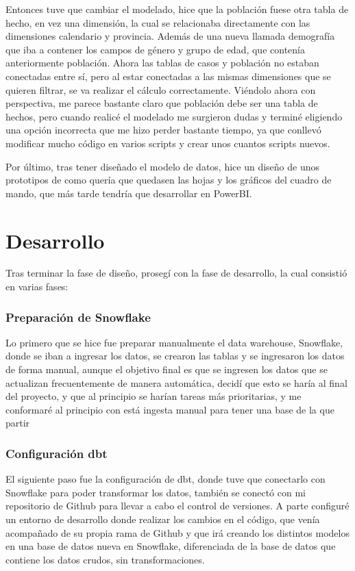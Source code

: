 Entonces tuve que cambiar el modelado, hice que la población fuese otra tabla de hecho, en vez una dimensión, la cual se relacionaba directamente con las dimensiones calendario y provincia. Además de una nueva llamada demografía que iba a contener los campos de género y grupo de edad, que contenía anteriormente población. Ahora las tablas de casos y población no estaban conectadas entre sí, pero al estar conectadas a las mismas dimensiones que se quieren filtrar, se va realizar el cálculo correctamente. Viéndolo ahora con perspectiva, me parece bastante claro que población debe ser una tabla de hechos, pero cuando realicé el modelado me surgieron dudas y terminé eligiendo una opción incorrecta que me hizo perder bastante tiempo, ya que conllevó modificar mucho código en varios scripts y crear unos cuantos scripts nuevos.

Por último, tras tener diseñado el modelo de datos, hice un diseño de unos prototipos de como quería que quedasen las hojas y los gráficos del cuadro de mando, que más tarde tendría que desarrollar en PowerBI.

\section{Desarrollo}

Tras terminar la fase de diseño, prosegí con la fase de desarrollo, la cual consistió en varias fases:

\subsubsection{Preparación de Snowflake}

Lo primero que se hice fue preparar manualmente el data warehouse, Snowflake, donde se iban a ingresar los datos, se crearon las tablas y se ingresaron los datos de forma manual, aunque el objetivo final es que se ingresen los datos que se actualizan frecuentemente de manera automática, decidí que esto se haría al final del proyecto, y que al principio se harían tareas más prioritarias, y me conformaré al principio con está ingesta manual para tener una base de la que partir

\subsubsection{Configuración dbt}

El siguiente paso fue la configuración de dbt, donde tuve que conectarlo con Snowflake para poder transformar los datos, también se conectó con mi repositorio de Github para llevar a cabo el control de versiones. A parte configuré un entorno de desarrollo donde realizar los cambios en el código, que venía acompañado de su propia rama de Github y que irá creando los distintos modelos en una base de datos nueva en Snowflake, diferenciada de la base de datos que contiene los datos crudos, sin transformaciones.

